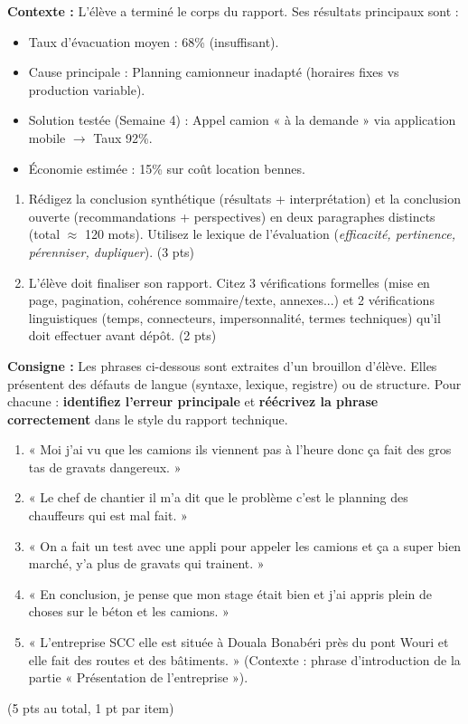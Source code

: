 \documentclass[11pt]{article}
\begin{document}
\begin{exercice}
    \textbf{Contexte :} L'élève a terminé le corps du rapport. Ses résultats principaux sont :
    \begin{itemize}
        \item Taux d'évacuation moyen : 68\% (insuffisant).
        \item Cause principale : Planning camionneur inadapté (horaires fixes vs production variable).
        \item Solution testée (Semaine 4) : Appel camion « à la demande » via application mobile $\rightarrow$ Taux 92\%.
        \item Économie estimée : 15\% sur coût location bennes.
    \end{itemize}
    
    \begin{enumerate}
        \item Rédigez la conclusion synthétique (résultats + interprétation) et la conclusion ouverte (recommandations + perspectives) en deux paragraphes distincts (total $\approx$ 120 mots). Utilisez le lexique de l'évaluation (\textit{efficacité, pertinence, pérenniser, dupliquer}). (3 pts)
        \item L'élève doit finaliser son rapport. Citez 3 vérifications formelles (mise en page, pagination, cohérence sommaire/texte, annexes...) et 2 vérifications linguistiques (temps, connecteurs, impersonnalité, termes techniques) qu'il doit effectuer avant dépôt. (2 pts)
    \end{enumerate}
\end{exercice}

\begin{exercice}
    \textbf{Consigne :} Les phrases ci-dessous sont extraites d'un brouillon d'élève. Elles présentent des défauts de langue (syntaxe, lexique, registre) ou de structure. Pour chacune : \textbf{identifiez l'erreur principale} et \textbf{réécrivez la phrase correctement} dans le style du rapport technique.
    
    \begin{enumerate}
        \item « Moi j'ai vu que les camions ils viennent pas à l'heure donc ça fait des gros tas de gravats dangereux. »
        \item « Le chef de chantier il m'a dit que le problème c'est le planning des chauffeurs qui est mal fait. »
        \item « On a fait un test avec une appli pour appeler les camions et ça a super bien marché, y'a plus de gravats qui trainent. »
        \item « En conclusion, je pense que mon stage était bien et j'ai appris plein de choses sur le béton et les camions. »
        \item « L'entreprise SCC elle est située à Douala Bonabéri près du pont Wouri et elle fait des routes et des bâtiments. » (Contexte : phrase d'introduction de la partie « Présentation de l'entreprise »).
    \end{enumerate}
    (5 pts au total, 1 pt par item)
\end{exercice}
\end{document}
